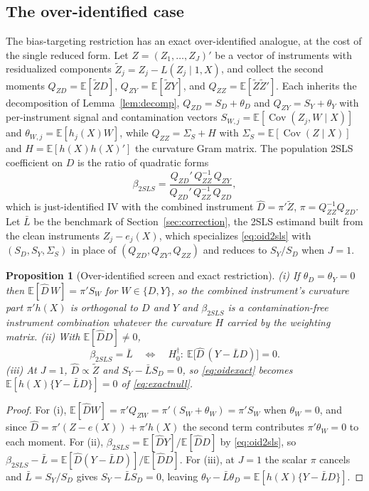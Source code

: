 \documentclass[preprint,11pt,authoryear]{elsarticle}
\newtheorem{proposition}{Proposition}
\theoremstyle{definition}
\newcommand{\E}{\mathbb{E}}
\newcommand{\Cov}{\operatorname{Cov}}
\begin{document}
\subsection{The over-identified case}\label{sec:overid}

The bias-targeting restriction has an exact over-identified analogue, at the cost of the
single reduced form. Let $Z=(Z_1,\dots,Z_J)'$ be a vector of instruments with residualized
components $\tilde Z_j=Z_j-L(Z_j\mid1,X)$, and collect the second moments
$Q_{ZD}=\E[\tilde Z D]$, $Q_{ZY}=\E[\tilde Z Y]$, and $Q_{ZZ}=\E[\tilde Z\tilde Z']$. Each
inherits the decomposition of Lemma~\ref{lem:decomp}, $Q_{ZD}=S_D+\theta_D$ and
$Q_{ZY}=S_Y+\theta_Y$ with per-instrument signal and contamination vectors
$S_{W,j}=\E[\Cov(Z_j,W\mid X)]$ and $\theta_{W,j}=\E[h_j(X)W]$, while
$Q_{ZZ}=\Sigma_S+H$ with $\Sigma_S=\E[\Cov(Z\mid X)]$ and $H=\E[h(X)h(X)']$ the curvature
Gram matrix. The population 2SLS coefficient on $D$ is the ratio of quadratic forms
\begin{equation}\label{eq:oid2sls}
\beta_{2SLS}=\frac{Q_{ZD}'\,Q_{ZZ}^{-1}\,Q_{ZY}}{Q_{ZD}'\,Q_{ZZ}^{-1}\,Q_{ZD}},
\end{equation}
which is just-identified IV with the combined instrument $\hat D=\pi'\tilde Z$,
$\pi=Q_{ZZ}^{-1}Q_{ZD}$. Let $\bar L$ be the benchmark of Section~\ref{sec:correction}, the
2SLS estimand built from the clean instruments $Z_j-e_j(X)$, which specializes
\eqref{eq:oid2sls} with $(S_D,S_Y,\Sigma_S)$ in place of $(Q_{ZD},Q_{ZY},Q_{ZZ})$ and
reduces to $S_Y/S_D$ when $J=1$.

\begin{proposition}[Over-identified screen and exact restriction]\label{prop:overid}
(i) If $\theta_D=\theta_Y=0$ then $\E[\hat D\,W]=\pi'S_W$ for $W\in\{D,Y\}$, so the combined
instrument's curvature part $\pi'h(X)$ is orthogonal to $D$ and $Y$ and $\beta_{2SLS}$ is a
contamination-free instrument combination whatever the curvature $H$ carried by the
weighting matrix. (ii) With $\E[\hat D D]\neq0$,
\begin{equation}\label{eq:oidexact}
\beta_{2SLS}=\bar L\quad\Longleftrightarrow\quad
H_0^{\dagger}:\ \E\big[\hat D\,(Y-\bar L D)\big]=0 .
\end{equation}
(iii) At $J=1$, $\hat D\propto\tilde Z$ and $S_Y-\bar L S_D=0$, so \eqref{eq:oidexact}
becomes $\E[h(X)\{Y-\bar L D\}]=0$ of \eqref{eq:exactnull}.
\end{proposition}

\begin{proof}
For (i), $\E[\hat D W]=\pi'Q_{ZW}=\pi'(S_W+\theta_W)=\pi'S_W$ when $\theta_W=0$, and since
$\hat D=\pi'(Z-e(X))+\pi'h(X)$ the second term contributes $\pi'\theta_W=0$ to each
moment. For (ii), $\beta_{2SLS}=\E[\hat D Y]/\E[\hat D D]$ by \eqref{eq:oid2sls}, so
$\beta_{2SLS}-\bar L=\E[\hat D(Y-\bar L D)]/\E[\hat D D]$. For (iii), at $J=1$ the scalar
$\pi$ cancels and $\bar L=S_Y/S_D$ gives $S_Y-\bar L S_D=0$, leaving
$\theta_Y-\bar L\theta_D=\E[h(X)\{Y-\bar L D\}]$.
\end{proof}
\end{document}
